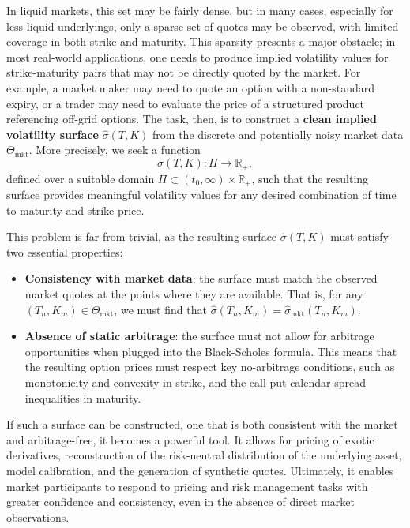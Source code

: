 In liquid markets, this set may be fairly dense, but in many cases, especially for less liquid underlyings, only a sparse set of quotes may be observed, with limited coverage in both strike and maturity.
This sparsity presents a major obstacle; in most real-world applications, one needs to produce implied volatility values for strike-maturity pairs that may not be directly quoted by the market.
For example, a market maker may need to quote an option with a non-standard expiry, or a trader may need to evaluate the price of a structured product referencing off-grid options.
The task, then, is to construct a \textbf{clean implied volatility surface} $\hat{\sigma}(T, K)$ from the discrete and potentially noisy market data $\Theta_{\text{mkt}}$.
More precisely, we seek a function
\[
    \hat{\sigma}(T, K): \Pi \to \mathbb{R}_+,
\]
defined over a suitable domain $\Pi \subset (t_0, \infty) \times \mathbb{R}_+$, such that the resulting surface provides meaningful volatility values for any desired combination of time to maturity and strike price.

This problem is far from trivial, as the resulting surface $\hat{\sigma}(T, K)$ must satisfy two essential properties:

\begin{itemize}
    \item \textbf{Consistency with market data}: the surface must match the observed market quotes at the points where they are available.
          That is, for any $(T_n, K_m) \in \Theta_{\text{mkt}}$, we must find that $\hat{\sigma}(T_n, K_m) = \hat{\sigma}_{\text{mkt}}(T_n, K_m)$.
    \item \textbf{Absence of static arbitrage}: the surface must not allow for arbitrage opportunities when plugged into the Black-Scholes formula.
          This means that the resulting option prices must respect key no-arbitrage conditions, such as monotonicity and convexity in strike, and the call-put calendar spread inequalities in maturity.
\end{itemize}

If such a surface can be constructed, one that is both consistent with the market and arbitrage-free, it becomes a powerful tool.
It allows for pricing of exotic derivatives, reconstruction of the risk-neutral distribution of the underlying asset, model calibration, and the generation of synthetic quotes.
Ultimately, it enables market participants to respond to pricing and risk management tasks with greater confidence and consistency, even in the absence of direct market observations.

